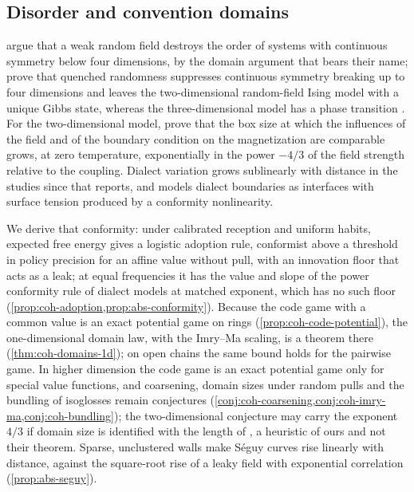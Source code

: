 \subsection{Disorder and convention domains}\label{sec:rel-disorder}

\citet{imry1975random} argue that a weak random field destroys the order of systems with continuous symmetry below four dimensions, by the domain argument that bears their name; \citet{aizenman1989rounding,aizenman1990rounding} prove that quenched randomness suppresses continuous symmetry breaking up to four dimensions and leaves the two-dimensional random-field Ising model with a unique Gibbs state, whereas the three-dimensional model has a phase transition \citep{bricmont1988phase}. For the two-dimensional model, \citet{ding2023correlation} prove that the box size at which the influences of the field and of the boundary condition on the magnetization are comparable grows, at zero temperature, exponentially in the power $-4/3$ of the field strength relative to the coupling. Dialect variation grows sublinearly with distance in the studies since \citet{seguy1971relation} that \citet{nerbonne2010measuring} reports, and \citet{burridge2017spatial} models dialect boundaries as interfaces with surface tension produced by a conformity nonlinearity.

We derive that conformity: under calibrated reception and uniform habits, expected free energy gives a logistic adoption rule, conformist above a threshold in policy precision for an affine value without pull, with an innovation floor that acts as a leak; at equal frequencies it has the value and slope of the power conformity rule of dialect models at matched exponent, which has no such floor (\cref{prop:coh-adoption,prop:abs-conformity}). Because the code game with a common value is an exact potential game on rings (\cref{prop:coh-code-potential}), the one-dimensional domain law, with the Imry--Ma scaling, is a theorem there (\cref{thm:coh-domains-1d}); on open chains the same bound holds for the pairwise game. In higher dimension the code game is an exact potential game only for special value functions, and coarsening, domain sizes under random pulls and the bundling of isoglosses remain conjectures (\cref{conj:coh-coarsening,conj:coh-imry-ma,conj:coh-bundling}); the two-dimensional conjecture may carry the exponent $4/3$ if domain size is identified with the length of \citet{ding2023correlation}, a heuristic of ours and not their theorem. Sparse, unclustered walls make S\'eguy curves rise linearly with distance, against the square-root rise of a leaky field with exponential correlation (\cref{prop:abs-seguy}).

